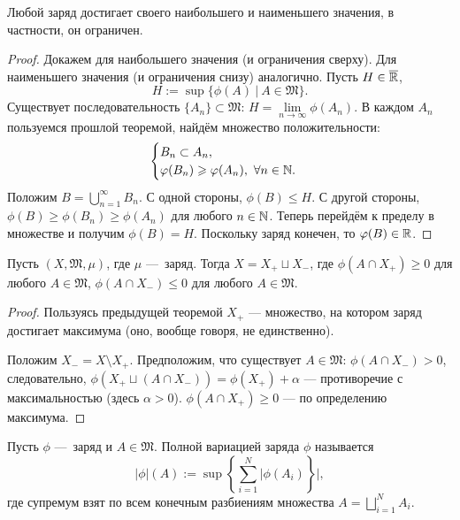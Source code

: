 \begin{theorem}
    Любой заряд достигает своего наибольшего и наименьшего значения, в частности, он ограничен.
\end{theorem} 
\begin{proof}
    Докажем для наибольшего значения (и ограничения сверху). Для наименьшего значения (и ограничения снизу) аналогично.
    Пусть $H \in \overline{\mathbb{R}}$,
    \[H := \sup\{\phi(A) \ | \ A \in \mathfrak{M}\}.\]
    Существует последовательность $\{A_n\} \subset \mathfrak{M}$: $H = \lim\limits_{n\to \infty}\phi(A_n)$.
    В каждом $A_n$ пользуемся прошлой теоремой, найдём множество положительности:
    \[\begin{cases}
        B_n \subset A_n, \\
        \varphi(B_n) \geqslant \varphi(A_n), \ \forall n \in \mathbb{N}.
    \end{cases}
    \]
    Положим $B = \bigcup\limits_{n=1}^{\infty}B_n$.
    С одной стороны, $\phi(B) \leqslant H$.
    С другой стороны, $\phi(B) \geqslant \phi(B_n) \geqslant \phi(A_n)$ для любого $n \in \mathbb{N}$.
    Теперь перейдём к пределу в множестве и получим $\phi(B) = H$.
    Поскольку заряд конечен, то $\varphi(B) \in \mathbb{R}$.
\end{proof} 

\begin{theorem}
    Пусть $(X, \mathfrak{M}, \mu)$, где $\mu$ — заряд.
    Тогда $X = X_+ \sqcup X_-$, где $\phi(A \cap X_+) \geqslant 0$ для любого $A \in \mathfrak{M}$, $\phi(A \cap X_-) \leqslant 0$ для любого $A \in \mathfrak{M}$.
\end{theorem} 
\begin{proof}
    Пользуясь предыдущей теоремой $X_+$ — множество, на котором заряд достигает максимума (оно, вообще говоря, не единственно).
    
    Положим $X_- = X \setminus X_+$.
    Предположим, что существует $A \in \mathfrak{M}$: $\phi(A \cap X_-) > 0$, следовательно, $\phi(X_+ \sqcup (A \cap X_-)) = \phi(X_+) + \alpha$ — противоречие с максимальностью (здесь $\alpha > 0$).
    $\phi(A \cap X_+) \geqslant 0$ — по определению максимума.
\end{proof} 

\begin{definition}
    Пусть $\phi$ — заряд и $A \in \mathfrak{M}$. Полной вариацией заряда $\phi$ называется
    \[|\phi|(A) := \sup\left\{\sum\limits_{i=1}^{N}|\phi(A_i)\right\}|,\]
    где супремум взят по всем конечным разбиениям множества $A = \bigsqcup\limits_{i=1}^{N}A_i$.
\end{definition} 

